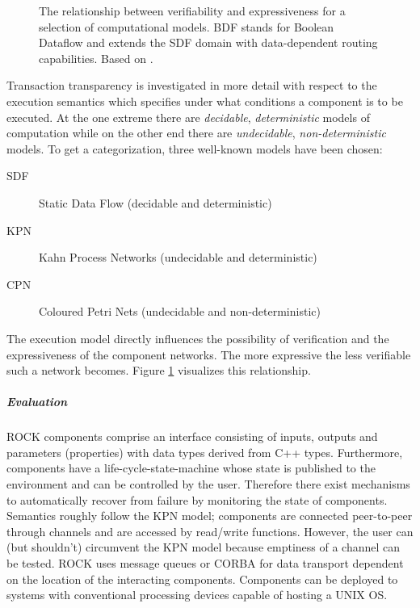 \documentclass[a4paper,twocolumn]{esapub2005} %
\begin{document}
\begin{figure}
    \centering
    \caption{
        The relationship between verifiability and expressiveness for a selection of computational models.
        BDF stands for Boolean Dataflow and extends the SDF domain with data-dependent routing capabilities.
        Based on \cite{Basten}.
    }
    \label{fig:verifiability}
\end{figure}
Transaction transparency is investigated in more detail with respect to the execution semantics which specifies under what conditions a component is to be executed.
At the one extreme there are \emph{decidable}, \emph{deterministic} models of computation
while on the other end there are \emph{undecidable}, \emph{non-deterministic} models.
To get a categorization, three well-known models have been chosen:
\begin{description}
    \item[SDF] Static Data Flow (decidable and deterministic)
    \item[KPN] Kahn Process Networks (undecidable and deterministic)
    \item[CPN] Coloured Petri Nets (undecidable and non-deterministic)
\end{description}
The execution model directly influences the possibility of verification and the expressiveness of the component networks.
The more expressive the less verifiable such a network becomes.
Figure \ref{fig:verifiability} visualizes this relationship.

\subparagraph{Evaluation}
ROCK components comprise an interface consisting of inputs, outputs and parameters (properties) with data types derived from C++ types.
Furthermore, components have a life-cycle-state-machine whose state is published to the environment and can be controlled by the user.
Therefore there exist mechanisms to automatically recover from failure by monitoring the state of components. %
Semantics roughly follow the KPN model; components are connected peer-to-peer through channels and are accessed by read/write functions. %
However, the user can (but shouldn't) circumvent the KPN model because emptiness of a channel can be tested.
ROCK uses message queues or CORBA for data transport dependent on the location of the interacting components. %
Components can be deployed to systems with conventional processing devices capable of hosting a UNIX OS. %
\end{document}

